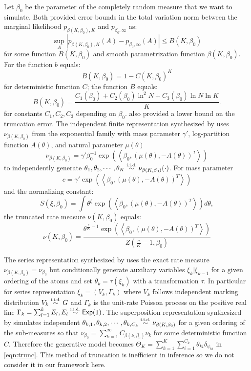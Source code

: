 \documentclass[letterpaper]{article}
\begin{document}
Let $\beta_0$ be the parameter of the completely random measure that we want to simulate. Both \cite{campbell19,nguyen20} provided error bounds in the total variation norm between the marginal likelihood $p_{\beta(K,\beta_0),K}$ and $p_{\beta_0,\infty}$ as:
\[
	\sup_A\left|p_{\beta(K,\beta_0),K}(A)-p_{\beta_0,\infty}(A)\right|\le B(K,\beta_0)
\]
for some function $B(K,\beta_0)$ and smooth parametrization function $\beta(K,\beta_0)$. For \cite{campbell19} the function $b$ equals:
\[
	B(K,\beta_0)=1-C(K,\beta_0)^K
\]
for deterministic function $C$; \cite{nguyen20} the function $B$ equals:
\[
	B(K,\beta_0)=\frac{C_1(\beta_0)+C_2(\beta_0)\ln^2N+C_3(\beta_0)\ln N\ln K}{K}.
\]
for constants $C_1,C_2,C_3$ depending on $\beta_0$. \cite{nguyen20} also provided a lower bound on the truncation error. The independent finite representation synthesized by \cite{nguyen20} uses $\nu_{\beta(K,\beta_0)}$ from the exponential family \cite{broderick18} with mass parameter $\gamma'$, log-partition function $A(\theta)$, and natural parameter $\mu(\theta)$ 
\[
	\nu_{\beta(K,\beta_0)}=\gamma'\beta_0^{-1}\exp\left(\left<\beta_0,\left(\mu(\theta),-A(\theta)\right)^T\right>\right)
\]
to independently generate $\theta_1,\theta_2,\cdots,\theta_K\distiid\nu_{\beta(K,\beta_0)}(\cdot)$.  For mass parameter 
\[
	c=\gamma'\exp\left(\left<\beta_0,\left(\mu(\theta),-A(\theta)\right)^T\right>\right)
\] and the normalizing constant:
\[
	S(\xi,\beta_0)=\int\theta^\xi\exp\left(\left<\beta_0,\left(\mu(\theta),-A(\theta)\right)^T\right>\right)d\theta,
\] 
the truncated rate measure $\nu(K,\beta_0)$ equals:
\[
	\nu(K,\beta_0)=\frac{\theta^{\frac{c}{K}-1}\exp\left(\left<\beta_0,\left(\mu(\theta),-A(\theta)\right)^T\right>\right)}{Z\left(\frac{c}{K}-1,\beta_0\right)}
\] 

The series representation synthesized by \cite{campbell19} uses the exact rate measure $\nu_{\beta(K,\beta_0)}=\nu_{\beta_0}$ but conditionally generate auxiliary variables $\xi_k|\xi_{k-1}$ for a given ordering of the atoms and set $\theta_k=\tau(\xi_k)$ with a transformation $\tau$. In particular for series representation $\xi_k=(V_k,\Gamma_k)$ where $V_k$ follows independent marking distribution $V_k\distiid G$ and $\Gamma_k$ is the unit-rate Poisson process on the positive real line $\Gamma_k=\sum_{l=1}^kE_l,E_l\distiid\distExp(1)$. The superposition representation synthesized by \cite{campbell19} simulates independent $\theta_{k,1},\theta_{k,2},\cdots,\theta_{k,C_k}\distiid\nu_{\beta(K,\beta_0)}$ for a given ordering of the sub-measures so  that $\nu_{\beta_0}=\sum_{k=1}^\infty C_{\beta(k,\beta_0)}\nu_k$ for some deterministic function $C$. Therefore the generative model becomes $\Theta_K=\sum_{k=1}^K\sum_{i=1}^{C_k}\theta_{ki}\delta_{\psi_{ki}}$ in \ref{eqn:trunc}. This method of truncation is inefficient in inference \cite{zhu20,nguyen20} so we do not consider it in our framework here. 
\end{document}
